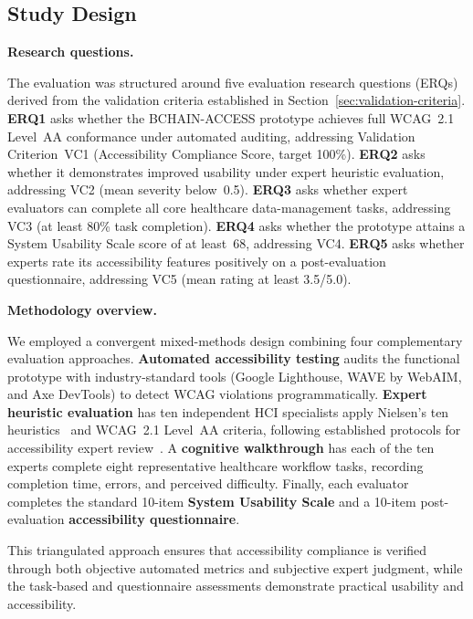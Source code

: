 \documentclass[journal,onecolumn]{IEEEtran}
\begin{document}
\subsection{Study Design}
\label{subsec:study-design}

\noindent\textbf{Research questions.}

The evaluation was structured around five evaluation research questions
(ERQs) derived from the validation criteria established in Section~\ref{sec:validation-criteria}. \textbf{ERQ1} asks whether the BCHAIN-ACCESS prototype achieves full WCAG~2.1 Level~AA conformance under automated auditing, addressing Validation Criterion~VC1 (Accessibility Compliance Score, target 100\%). \textbf{ERQ2} asks whether it demonstrates improved usability under expert heuristic evaluation, addressing VC2 (mean severity below~0.5). \textbf{ERQ3} asks whether expert evaluators can complete all core healthcare data-management tasks, addressing VC3 (at least 80\% task completion). \textbf{ERQ4} asks whether the prototype attains a System Usability Scale score of at least~68, addressing VC4. \textbf{ERQ5} asks whether experts rate its accessibility features positively on a post-evaluation questionnaire, addressing VC5 (mean rating at least 3.5/5.0).

\noindent\textbf{Methodology overview.}

We employed a convergent mixed-methods design\cite{creswell2017research}
combining four complementary evaluation approaches. \textbf{Automated accessibility testing} audits the functional prototype with industry-standard tools (Google Lighthouse, WAVE by WebAIM, and Axe DevTools) to detect WCAG violations programmatically. \textbf{Expert heuristic evaluation} has ten independent HCI specialists apply Nielsen's ten heuristics~\cite{nielsen1994usability} and WCAG~2.1 Level~AA criteria, following established protocols for accessibility expert review~\cite{paz2019heuristic}. A \textbf{cognitive walkthrough} has each of the ten experts complete eight representative healthcare workflow tasks, recording completion time, errors, and perceived difficulty. Finally, each evaluator completes the standard 10-item \textbf{System Usability Scale} and a 10-item post-evaluation \textbf{accessibility questionnaire}.

This triangulated approach ensures that accessibility compliance is
verified through both objective automated metrics and subjective expert
judgment, while the task-based and questionnaire assessments demonstrate
practical usability and accessibility.
\end{document}
